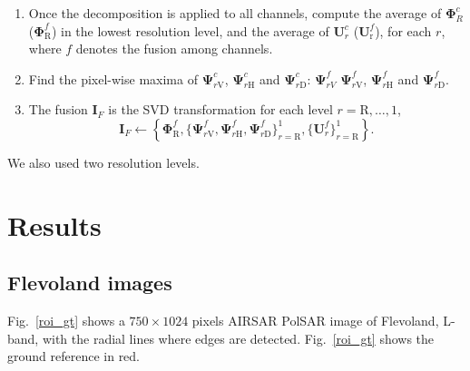 \documentclass[journal]{IEEEtran}
\begin{document}
\begin{enumerate}
\item Once the decomposition is applied to all channels, 
compute the average of $\bm\Phi_R^c$ ($\bm\Phi_\text{R}^f$) in the lowest resolution level, and the average 
of $\bm U_r^c$ ($\bm U_\text{r}^f$), for each $r$, where $f$ denotes the fusion among channels. 
\item Find the pixel-wise maxima of $\bm\Psi_{r\text{V}}^c$, $\bm\Psi_{r\text{H}}^c$ and $\bm\Psi_{r\text{D}}^c$: $ \bm\Psi_{rV}^f$ $\bm\Psi_{r\text{V}}^f$, $\bm\Psi_{r\text{H}}^f$ and $\bm\Psi_{r\text{D}}^f$.
\item The fusion $\bm I_F$ is the SVD transformation for each level $r=\text{R},\dots,1$,  
\begin{equation}\nonumber
\bm I_F\leftarrow \left\{\bm \Phi_\text{R}^f,\{\bm\Psi_{r\text{V}}^f,\bm\Psi_{r\text{H}}^f,\bm\Psi_{r\text{D}}^f \}_{r=\text{R}}^1,\{\bm U_r^f\}_{r=\text{R}}^1 \right\}.
\end{equation}
\end{enumerate}
We also used two resolution levels.

\section{Results}\label{sec_05}

\subsection{Flevoland images}

Fig.~\ref{roi_gt} shows a $750\times 1024$ pixels AIRSAR PolSAR image of Flevoland, L-band, with the radial lines where edges are detected. 
Fig.~\ref{roi_gt} shows the ground reference in red.  
\end{document}
